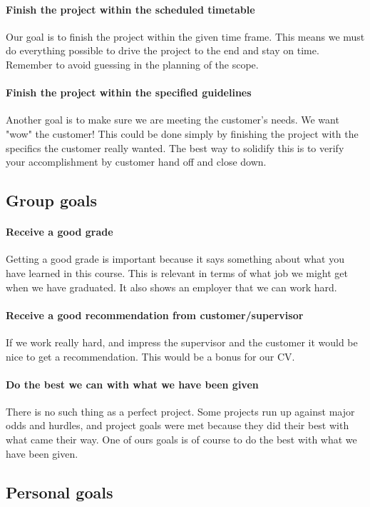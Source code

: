 \paragraph{Finish the project within the scheduled timetable}
Our goal is to finish the project within the given time frame. This means we must do everything possible to drive the project to the end and stay on time. Remember to avoid guessing in the planning of the scope.

\paragraph{Finish the project within the specified guidelines}
Another goal is to make sure we are meeting the customer's needs. We want "wow" the customer! 
This could be done simply by finishing the project with the specifics the customer really wanted. The best way to solidify this is to verify your accomplishment by customer hand off and close down.

\subsection{Group goals}
\paragraph{Receive a good grade}
Getting a good grade is important because it says something about what you have learned in this course. 
This is relevant in terms of what job we might get when we have graduated. It also shows an employer that we can work hard. 
\paragraph{Receive a good recommendation from customer/supervisor}
If we work really hard, and impress the supervisor and the customer it would be nice to get a recommendation. This would be a bonus for our CV.


\paragraph{Do the best we can with what we have been given}
There is no such thing as a perfect project.
Some projects run up against major odds and hurdles, and project goals were met because they did their best with what came their way. One of ours goals is of course to do the best with what we have been given.


\subsection{Personal goals}

